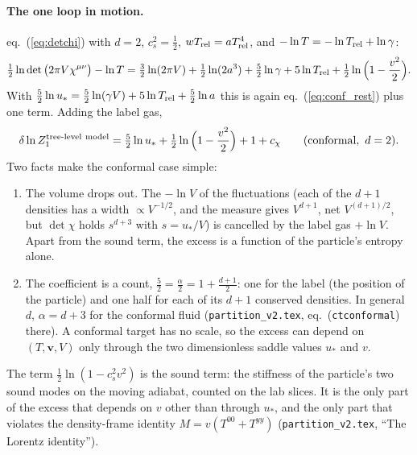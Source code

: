 \documentclass[11pt,aps,preprint,nofootinbib,superscriptaddress,tightenlines]{revtex4-2}
\def\st{\begin{equation}}
\def\stp{\end{equation}}
\def\Eq#1{eq.~(\ref{#1})}
\let\oldparagraph\paragraph
\renewcommand{\paragraph}{\par\bigskip\oldparagraph}
\begin{document}
\paragraph{The one loop in motion.}  \Eq{eq:detchi} with $d=2$, $c_s^2=\tfrac12$, $wT_{\rm rel}=aT_{\rm rel}^4$, and $-\ln T=-\ln T_{\rm rel}+\ln\gamma$:
\st
\tfrac12\ln\det\big(2\pi V\chi^{\mu\nu}\big)-\ln T=\tfrac32\ln(2\pi V)+\tfrac12\ln(2a^3)+\tfrac52\ln\gamma+5\ln T_{\rm rel}+\tfrac12\ln\Big(1-\frac{v^2}2\Big) .
\stp
With $\tfrac52\ln u_*=\tfrac52\ln(\gamma V)+5\ln T_{\rm rel}+\tfrac52\ln a$ this is again \Eq{eq:conf_rest} plus one term.  Adding the label gas,
\st
\delta\ln Z_1^{\rm tree\text{-}level\ model}=\tfrac52\ln u_*+\tfrac12\ln\Big(1-\frac{v^2}2\Big)+1+c_\chi\qquad(\text{conformal},\ d=2) .
\label{eq:confexcess}
\stp
Two facts make the conformal case simple:
\begin{enumerate}
\item The volume drops out.  The $-\ln V$ of the fluctuations (each of the $d+1$ densities has a width $\propto V^{-1/2}$, and the measure gives
  $V^{d+1}$, net $V^{(d+1)/2}$, but $\det\chi$ holds $s^{d+3}$ with $s=u_*/V$) is cancelled by the label gas $+\ln V$.  Apart from the sound term, the
  excess is a function of the particle's entropy alone.
\item The coefficient is a count, $\tfrac52=\tfrac\alpha2=1+\tfrac{d+1}2$: one for the label (the position of the particle) and one half for each of its
  $d+1$ conserved densities.  In general $d$, $\alpha=d+3$ for the conformal fluid (\nolinkurl{partition_v2.tex}, eq.~(\texttt{ctconformal}) there).  A
  conformal target has no scale, so the excess can depend on $(T,\bm v,V)$ only through the two dimensionless saddle values $u_*$ and $v$.
\end{enumerate}
The term $\tfrac12\ln(1-c_s^2v^2)$ is the sound term: the stiffness of the particle's two sound modes on the moving adiabat, counted on the lab
slices.  It is the only part of the excess that depends on $v$ other than through $u_*$, and the only part that violates the density-frame identity
$M=v(T^{00}+T^{yy})$ (\nolinkurl{partition_v2.tex}, ``The Lorentz identity'').
\end{document}
